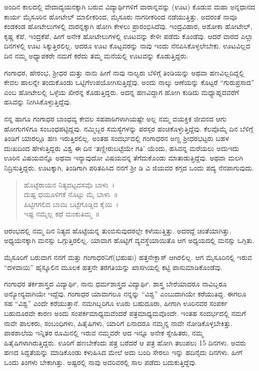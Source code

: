 {ಅಂದಿನ ಕಾಲದಲ್ಲಿ ವೇದಾದ್ಯಯನಕ್ಕಾಗಿ ಬರುವ ವಿದ್ಯಾರ್ಥಿಗಳಿಗೆ ವಾರಾನ್ನವನ್ನು (ಊಟ) ಕೊಡುವ ಮಹಾ ಅನ್ನಧಾನದ ಕಾರ್ಯ ಮೈಸೂರಿನ ಹೋಟೇಲ್ ಮಾಲೀಕ\-ರಿಂದ, ಮೈಸೂರು ನಾಗರೀಕರಿಂದ ನಡೆಯುತ್ತಿತ್ತು. ಅದರಂತೆ ನಾವೂ ಕಂಡ\enginline{-}ಕಂಡ  ಹೋಟೇಲುಗಳಲ್ಲಿ ವಾರನ್ನಕ್ಕಾಗಿ ಹೋಗಿ ಕೇಳಲು ಪ್ರಾರಂಭಿಸಿದೆವು. ಇಂದ್ರವಿಹಾರ,  ಅಶೋಕಾ ಹೋಟೇಲ್,  ಕೃಷ್ಣ ಕೆಪೆ, ಇಂದ್ರಕೆಪೆ,  ಹೀಗೆ ಅನೇಕ ಹೋಟೇಲುಗಳಲ್ಲಿ ಊಟವನ್ನು ಕೇಳೀ ಪಡೆದು ಕೊಂಡೆವು. ಆದರೆ ವಾರದ ಎಲ್ಲಾ ದಿನಗಳಲ್ಲಿ ಊಟ ಸಿಕ್ಕುತ್ತಿರಲಿಲ್ಲ. ಆದರೂ ಊಟ ಕೊಟ್ಟವರನ್ನು ನಾವು ಇಂದು ನೆನಪಿಸಿಕೊಳ್ಳಲೇಬೇಕು. ಊಟವಿಲ್ಲದ ದಿನ ನಮ್ಮ ಅಧ್ಯಾಪಕರೇ ನಮಗೆ ಕರೆದು ತಮ್ಮ ಮನೆಯಲ್ಲಿ ಊಟವನ್ನು ಕೊಡುತ್ತಿದ್ದರು. 

ಗಂಗಾಧರ,  ಹೇರಂಭ, ಶ್ರೀಧರ ಮತ್ತು ನಾನು ಹೀಗೆ ನಾವು ನಾಲ್ವರು ಬೆಳಿಗ್ಗೆ ತಿಂಡಿಯನ್ನು ಅಥವಾ ಹಣವಿಲ್ಲದಿದ್ದಲ್ಲಿ ಕೇವಲ   ಹಾಲನ್ನೇ ತಂದುಕೊಂಡು ಒಟ್ಟಿಗೆ\break ಉಪಯೋಗಿಸುತ್ತಿದ್ದೆವು. ಅಂದು ನಾಲ್ಕು ಆಣೆಯನ್ನು ಕೊಟ್ಟರೆ “ಗುರುಪ್ರಸಾದ” ಎಂಬ ಹೋಟೇಲಲ್ಲಿ  ಒಳ್ಳೆಯ ಖೀರನ್ನ ಕೊಡುತ್ತಿದ್ದರು. ಅದನ್ನ ಹಣವಿದ್ದಾಗ ಹೋಗಿ ಕುಡಿದು ಮಧ್ಯಾಹ್ನದವರೆಗೆ ಹಸಿವನ್ನು ನೀಗಿಸಿಕೊಳ್ಳುತ್ತಿದ್ದೆವು. 

ನನ್ನ ಹಾಗೂ ಗಂಗಾಧರ ಬಾಂಧವ್ಯ ಕೇವಲ ಸಹಪಾಠಿಗಳಾಗಿಯಷ್ಟೇ ಅಲ್ಲ ನಮ್ಮ ವಯಕ್ತಿಕ ಜೀವನದ ಆಗು ಹೋಗುಗಳಿಗೂ  ಸಂಬಂಧಪಟ್ಟಿದ್ದವು. ನಮ್ಮಿಬ್ಬರ ಸಮಸ್ಯೆಗಳನ್ನು ಪರಸ್ಪರ ಹಂಚಿಕೊಳ್ಳುತ್ತಿದ್ದೆವು. ಕೆಲವೊಮ್ಮೆ ದಿನ ಬೆಳಿಗ್ಗೆ ತಿಂಡಿಗೆ ಯಾರಲ್ಲೂ ಹಣ ಇರುತ್ತಿರಲಿಲ್ಲ. ಅಂತಹ ಸಂದರ್ಭದಲ್ಲಿ ಗಂಗಾಧರನ ಅಣ್ಣ ಶ್ರೀಧರಭಟ್ಟರು ಬಹಳ ದುಃಖ\-ದಿಂದ ಹೇಳುತ್ತಿದ್ದರು  \enginline{-}   ವಿಶ್ವ ಈ ದಿನ ‘ತಣ್ಣೀರುಬಟ್ಟೆಯೇ ಗತಿ’ ಯೆಂದು,  ಹಸಿವನ್ನ ಮರೆಯಲು ಅದು\enginline{-}ಇದು ಊರಿನ ವಿಷಯವನ್ನೊ ಅಥವಾ ಇನ್ಯಾವುದೋ ವಿಷಯವನ್ನ ತೆಗೆದುಕೊಂಡು ಮಾತಾಡುತ್ತಿದ್ದೆವು. ಅಥವಾ ಮಲಗಿ ನಿದ್ರಿಸುತ್ತಿದ್ದರು. ಊಟಕ್ಕಾಗಿ, ತಿಂಡಿಗಾಗಿ ಪರಿತಪಿಸಿದ ನನಗೆ ಶ್ರೀ ಡಿ ವಿ ಜಿಯವರ ಕಗ್ಗದ ಒಂದು ಪದ್ಯ ನೆನಪಾಗುವುದು. 

\begin{verse}
ಹೊಟ್ಟೆರಾಯನ ನಿತ್ಯದಟ್ಟದಸವೊ ಬಾಳು~। \\
ದುಷ್ಟ ಧಯೂಳಿಗಕೆ ನೊಟ್ಟು ಮೈ ಬಾಳು~॥ \\
ಹಿಟ್ಟಿಗಗಲಿದ ಬಾಯಿ ಬಟ್ಟೆಗೊಡ್ಡಿದ ಕೈಯಿ~। \\
ಇಷ್ಟ ನಮ್ಮೆಲ್ಲ  ಕಥೆ ಮಂಕುತಿಮ್ಮ~॥ 
\end{verse}

ಆರಂಭದಲ್ಲಿ ನಮ್ಮ ದಿನ ನಿತ್ಯದ ಹೊಟ್ಟೆಯನ್ನ ತುಂಬಿಸುವುದರಲ್ಲೇ ಕಳೆಯುತ್ತಿತ್ತು. ಅದರದ್ದೆ ಚಿಂತೆಯಾಗಿತ್ತು.  ಅಧ್ಯಯನಕ್ಕಾಗಿ ಮನಸ್ಸು ಒಗ್ಗುತ್ತಿರಲಿಲ್ಲ. ಯಾವಾಗ ಹೊಟ್ಟಿಗೆ  ವ್ಯವಸ್ಥೆಯಾಯಿತೊ ಆಗ ಅಧ್ಯಯದಲ್ಲಿ ಮನಸ್ಸು  ಒಗ್ಗಿತು. 

ಮೈಸೂರಿಗೆ ಬರುವಾಗ ನನಗೆ ಮತ್ತು ಗಂಗಾಧರನಿಗೆ(ಭಹುಷಃ) ಹತ್ತನೇಕ್ಲಾಸ್ ಆಗಿರ\-ಲಿಲ್ಲ. ಆಗ ಮೈಸೂರಿನಲ್ಲಿ ಇರುವ “ದಳವಾಯಿ” ಹೈಸ್ಕೂಲಿನ ಮೂಲಕ ಹತ್ತನೇ ತರಗತಿಯನ್ನು ಖಾಸಗಿಯಲ್ಲಿ ಕಟ್ಟಿ ಪಾಸುಮಾಡಿಕೊಂಡೆವು. 

ಗಂಗಾಧರ ತರ್ಕಶಾಸ್ತ್ರದ ವಿದ್ಯಾರ್ಥಿ,  ನಾನು ಧರ್ಮಶಾಸ್ತ್ರದ ವಿದ್ಯಾರ್ಥಿ. ಶಾಸ್ತ್ರ ಬೇರೆಯಾದರೂ ನಾವಿಬ್ಬರೂ ಅನ್ಯೋನ್ಯವಾಗಿಯೇ ಇದ್ದೆವು. ಗಂಗಾಧರ ಯಾವಾಗಲೂ ನನ್ನನ್ನು “ವಿಶ್ವ” ಎಂಬುದಾಗಿಯೇ ಕರೆಯುತಿದ್ದ. ಈಗಲೂ ಸಹ “ವಿಶ್ವ” ಎಂದೇ ಕರೆಯುತ್ತಾನೆ. ನಮಗಿಬ್ಬರಿಗೂ ಊರು ಬಹುದೂರಾ,  ಹೀಗಾಗಿ ಊರಿನವರ ಸಂಪರ್ಕ ಬಹುದೂರವೇ ಕಾರಣ ಅಂದು  ಸಂಪರ್ಕಮಾಧ್ಯಮವೆಂದರೆ ಪತ್ರಮಾಧ್ಯಮವೊಂದೇ. ಇಂತಹ ಸಂದರ್ಭದಲ್ಲಿ ನಮಗೆ ನಾವೇ ಪಾಲಕರು,  ಸಂಬಂಧಿಗಳು,  ಹಿತೈಷಿಗಳು,  ಯಾರಿಗೆ ಏನಾದರೂ ನಮ್ಮನ್ನ  ನಾವೇ ನೋಡಿಕೊಳ್ಳಬೇಕಿತ್ತು.  ಪಾಠಶಾಲೆಯ ಇನ್ನಿತರ  ರೂಮಿನಲ್ಲಿ  ಇರುವ ನಮ್ಮವರೇ ಆದ ಇನ್ನೂ ಅನೇಕ ಸ್ನೇಹಿತರು,  ನಮ್ಮ ಹಿತೈಷಿಗಳಾಗಿರು\-ತ್ತಿದ್ದರು.  ಊರಿಗೆ ಹಣಬೇಕೆಂದು ಪತ್ರ ಬರೆದರೆ ಆ ಪತ್ರ ಹೋಗಿ ತಲುಪಲು 15 ದಿನಗಳು. ಅವರು ಹಣದ ಸಿದ್ದತೆಯನ್ನು ಮಾಡಿಕೊಂಡು  ಕಳುಹಿಸಿದ ಮೇಲೆ ಅದು ಬಂದಿ ಸೇರಲು ಇನ್ನು ಹದಿನೈದು    ದಿನಗಳು. ಹೀಗೆ ಒಂದು ತಿಂಗಳು ಬೇಕಾಗಿತ್ತು.  ಅಷ್ಟರಲ್ಲಿ ನಾವು ಅವರಿವರಲ್ಲಿ ಸಾಲ ಪಡೆದು ಬದುಕುತ್ತಿದ್ದೆವು. 
\vskip 2pt

}
